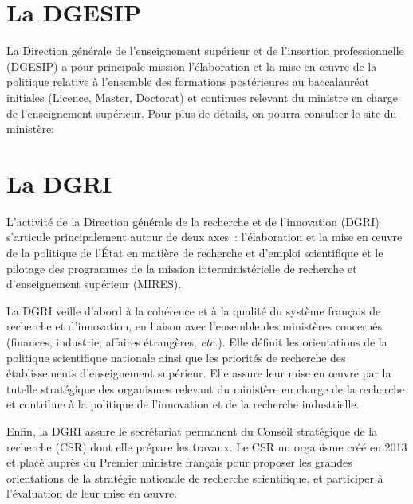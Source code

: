 \section{La DGESIP} \label{DGESIP}
La Direction g\'en\'erale de l'enseignement sup\'erieur et de l'insertion professionnelle (DGESIP) a
pour principale mission l'\'elabo\-ration et la mise en \oe{}uvre
de la politique relative \`a l'ensemble des formations
post\'erieures au baccalaur\'eat initiales (Licence, Master, Doctorat) et continues
relevant du ministre en charge de l'enseignement sup\'erieur.
Pour plus de d\'etails, on pourra consulter le site du minist\`ere:\\
{\small {}}

\section{La DGRI}
L'activit\'e de la Direction g\'en\'erale de la recherche et de l'innovation (DGRI) s'articule principalement autour de deux axes~: 
l'\'elaboration et la mise en \oe uvre de la politique de l'\'Etat en mati\`ere de recherche et d'emploi scientifique
et le pilotage des programmes de la mission interminist\'erielle de recherche et d'enseignement sup\'erieur (MIRES).

La DGRI veille d'abord \`a la coh\'erence et \`a la qualit\'e du
syst\`eme fran\c cais de recherche et d'innovation, en liaison avec
l'ensemble des minist\`eres concern\'es (finances, industrie,
affaires \'etrang\`eres, {\em etc.}). Elle d\'efinit les
orientations de la politique scientifique nationale ainsi que les
priorit\'es de recherche des \'etablissements d'enseignement
sup\'erieur. Elle assure leur mise en \oe uvre par la tutelle
strat\'egique des organismes relevant du minist\`ere en charge de la
recherche et contribue \`a la politique de l'innovation et de la
recherche industrielle.

Enfin, la DGRI assure le secr\'etariat permanent du Conseil strat\'egique de la recherche (CSR) dont elle pr\'epare les travaux.
Le CSR un organisme cr\'e\'e en 2013 et plac\'e aupr\`es du Premier ministre fran\c cais pour proposer les grandes orientations de la strat\'egie nationale 
de recherche scientifique, et participer \`a l'\'evaluation de leur mise en \oe uvre.

